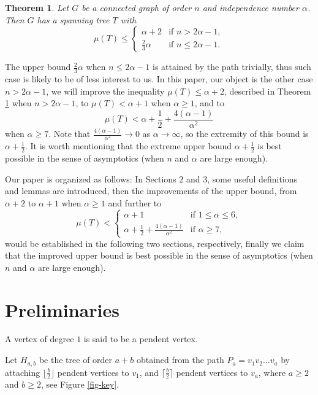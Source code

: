 \documentclass[12pt]{article}
\newtheorem{theoremalph}{Theorem}
\begin{document}
\begin{theoremalph} \cite{Muk14} \label{old}
Let $G$ be a connected graph of order $n$ and independence number $\alpha$. Then $G$ has a spanning tree $T$ with
$$
\renewcommand{\arraystretch}{1.2}
\mu(T) \le \left\{\begin{array}{ll}
 \alpha + 2
 & \mbox{if $n >2 \alpha - 1$},\\
\frac{2}{3} \alpha
 & \mbox{if $n \le 2 \alpha - 1$.}
\end{array}
\right.
$$
\end{theoremalph}

The upper bound $\frac{2}{3} \alpha$ when $n \le 2 \alpha - 1$ is attained by the path trivially, thus such case is likely to be of less interest to us.
In this paper, our object is the other case $n >2 \alpha - 1$, we will improve the inequality $\mu(T) \le \alpha + 2$, described in Theorem \ref{old} when $n >2 \alpha - 1$, to $\mu(T) < \alpha + 1$ when $\alpha \ge 1$, and to
$$
\mu(T) < \alpha + \frac{1}{2} + \frac{4(\alpha-1)}{\alpha^2}
$$
when $\alpha \ge 7$. Note that $\frac{4(\alpha-1)}{\alpha^2} \rightarrow 0$ as $\alpha \rightarrow \infty$, so the extremity of this bound is $\alpha + \frac{1}{2}$. It is worth mentioning that the extreme upper bound $\alpha + \frac{1}{2}$ is best possible in the sense of asymptotics (when $n$ and $\alpha$ are large enough).


Our paper is organized as follows: In Sections $2$ and $3$, some useful definitions and lemmas are introduced, then the improvements of the upper bound, from $\alpha + 2$ to $\alpha + 1$ when $\alpha \ge 1$ and further to
$$
\renewcommand{\arraystretch}{1.2}
\mu(T) < \left\{\begin{array}{ll}
\alpha + 1  & \mbox{if $1 \le \alpha \le 6$},\\
 \alpha + \frac{1}{2} + \frac{4(\alpha-1)}{\alpha^2}
 & \mbox{if $\alpha \ge 7$},
\end{array}
\right.
$$
would be established in the following two sections, respectively, finally we  claim that the improved upper bound  is  best possible in the sense of asymptotics (when $n$ and $\alpha$ are large enough).


\section{Preliminaries}

A vertex of degree $1$ is said to be a pendent vertex.

Let $H_{a,b}$ be the tree of order $a+b$ obtained from the path $P_a = v_1 v_2 \dots v_a$ by attaching $\lfloor\frac{b}{2} \rfloor$ pendent vertices to $v_1$, and $\lceil\frac{b}{2} \rceil$ pendent vertices to $v_a$, where $a \ge 2$ and $b \ge 2$, see Figure \ref{fig-key}.
\end{document}
